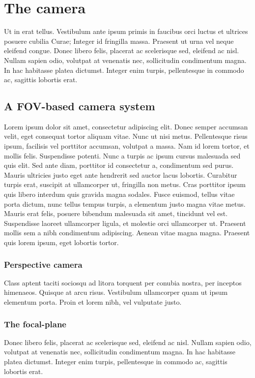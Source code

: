 \chapter{The camera}
Ut in erat tellus. Vestibulum ante ipsum primis in faucibus orci luctus et ultrices posuere cubilia Curae; Integer id fringilla massa. Praesent ut urna vel neque eleifend congue. Donec libero felis, placerat ac scelerisque sed, eleifend ac nisl. Nullam sapien odio, volutpat at venenatis nec, sollicitudin condimentum magna. In hac habitasse platea dictumst. Integer enim turpis, pellentesque in commodo ac, sagittis lobortis erat.
\section{A FOV-based camera system}
Lorem ipsum dolor sit amet, consectetur adipiscing elit. Donec semper accumsan velit, eget consequat tortor aliquam vitae. Nunc ut nisi metus. Pellentesque risus ipsum, facilisis vel porttitor accumsan, volutpat a massa. Nam id lorem tortor, et mollis felis. Suspendisse potenti. Nunc a turpis ac ipsum cursus malesuada sed quis elit. Sed ante diam, porttitor id consectetur a, condimentum sed purus. Mauris ultricies justo eget ante hendrerit sed auctor lacus lobortis. Curabitur turpis erat, suscipit at ullamcorper ut, fringilla non metus. Cras porttitor ipsum quis libero interdum quis gravida magna sodales. Fusce euismod, tellus vitae porta dictum, nunc tellus tempus turpis, a elementum justo magna vitae metus. Mauris erat felis, posuere bibendum malesuada sit amet, tincidunt vel est. Suspendisse laoreet ullamcorper ligula, et molestie orci ullamcorper ut. Praesent mollis sem a nibh condimentum adipiscing. Aenean vitae magna magna. Praesent quis lorem ipsum, eget lobortis tortor.
\subsection{Perspective camera}
Class aptent taciti sociosqu ad litora torquent per conubia nostra, per inceptos himenaeos. Quisque at arcu risus. Vestibulum ullamcorper quam ut ipsum elementum porta. Proin et lorem nibh, vel vulputate justo.
\subsection{The focal-plane}
Donec libero felis, placerat ac scelerisque sed, eleifend ac nisl. Nullam sapien odio, volutpat at venenatis nec, sollicitudin condimentum magna. In hac habitasse platea dictumst. Integer enim turpis, pellentesque in commodo ac, sagittis lobortis erat.

